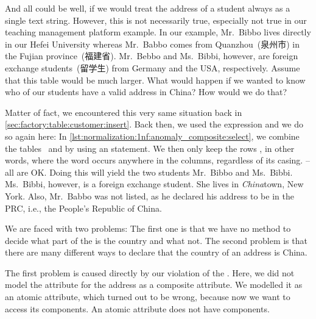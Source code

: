And all could be well, if we would treat the address of a student always as a single text string.
However, this is not necessarily true, especially not true in our teaching management platform example.
In our example, Mr.~Bibbo lives directly in our Hefei University whereas Mr.~Babbo comes from Quanzhou~(泉州市) in the Fujian province~(福建省).
Mr.~Bebbo and Ms.~Bibbi, however, are foreign exchange students~(留学生) from Germany and the USA, respectively.
Assume that this table would be much larger.
What would happen if we wanted to know who of our students have a valid address in China?
How would we do that?%
%
\begin{sloppypar}%
Matter of fact, we encountered this very same situation back in \cref{sec:factory:table:customer:insert}.
Back then, we used the  expression and we do so again here:
In \cref{lst:normalization:1nf:anomaly_composite:select}, we combine the tables~ and  by using an  statement.
We then only keep the rows , in other words, where the word  occurs anywhere in the  columns, regardless of its casing.
    -- all are OK.
Doing this will yield the two students Mr.~Bibbo and Ms.~Bibbi.
Ms.~Bibbi, however, is a foreign exchange student.
She lives in \emph{China}town, New York.
Also, Mr.~Babbo was not listed, as he declared his address to be in the PRC, i.e., the People's Republic of China.%
\end{sloppypar}%
%
We are faced with two problems:
The first one is that we have no method to decide what part of the  is the country and what not.
The second problem is that there are many different ways to declare that the country of an address is China.

The first problem is caused directly by our violation of the .
Here, we did not model the attribute for the address as a composite attribute.
We modelled it as an atomic attribute, which turned out to be wrong, because now we want to access its components.
An atomic attribute does not have components.

